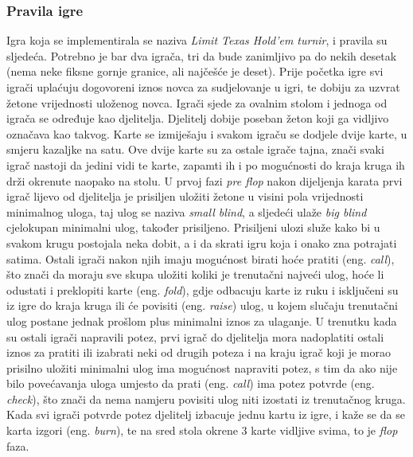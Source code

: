 \subsubsection{Pravila igre}
Igra koja se implementirala se naziva \emph{Limit Texas Hold'em turnir}, i pravila su sljedeća. 
Potrebno je bar dva igrača, tri da bude zanimljivo pa do nekih desetak (nema neke fiksne gornje granice, 
ali najčešće je deset). Prije početka igre svi igrači uplaćuju dogovoreni iznos novca za sudjelovanje u igri, te dobiju za uzvrat žetone vrijednosti uloženog novca. Igrači sjede za ovalnim stolom i jednoga od igrača se određuje kao djelitelja. Djelitelj dobije poseban žeton koji ga vidljivo označava kao takvog. Karte se izmiješaju i svakom igraču se dodjele dvije karte, u smjeru kazaljke na satu. Ove dvije karte su za ostale igrače tajna, znači svaki igrač nastoji da jedini vidi te karte, zapamti ih i po mogućnosti do kraja kruga ih drži okrenute naopako na stolu. U prvoj fazi \emph{pre flop} nakon dijeljenja karata prvi igrač lijevo od djelitelja je prisiljen uložiti žetone u visini pola vrijednosti minimalnog uloga, taj ulog se naziva \emph{small blind}, a sljedeći ulaže \emph{big blind} cjelokupan minimalni ulog, također prisiljeno. Prisiljeni ulozi služe kako bi u svakom krugu postojala neka dobit, a i da skrati igru koja i onako zna potrajati satima. Ostali igrači nakon njih imaju mogućnost birati hoće pratiti (eng. \textit{call}), što znači da moraju sve skupa uložiti koliki je trenutačni najveći ulog, hoće li odustati i preklopiti karte (eng. \textit{fold}), gdje odbacuju karte iz ruku i isključeni su iz igre do kraja kruga ili će povisiti (eng. \textit{raise}) ulog, u kojem slučaju trenutačni ulog postane jednak prošlom plus minimalni iznos za ulaganje. U trenutku kada su ostali igrači napravili potez, prvi igrač do djelitelja mora nadoplatiti ostali iznos za pratiti ili izabrati neki od drugih poteza i na kraju igrač koji je morao prisilno uložiti minimalni ulog ima mogućnost napraviti potez, s tim da ako nije bilo povećavanja uloga umjesto da prati (eng. \textit{call}) ima potez potvrde (eng. \textit{check}), što znači da nema namjeru povisiti ulog niti izostati iz trenutačnog kruga. Kada svi igrači potvrde potez djelitelj izbacuje jednu kartu iz igre, i kaže se da se karta izgori (eng. \textit{burn}), te na sred stola okrene 3 karte vidljive svima, to je \emph{flop} faza. 
